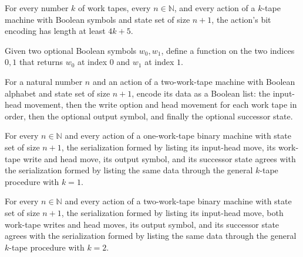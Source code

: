 \begin{lemma}
\label{Turing.codeActionK_length}
\leanok
{}
For every number $k$ of work tapes, every $n\in\mathbb N$, and every action of a
$k$-tape machine with Boolean symbols and state set of size $n+1$, the action’s bit
encoding has length at least $4k+5$.
\end{lemma}

\begin{definition}
\label{Turing.workPair}
\leanok
Given two optional Boolean symbols $w_0,w_1$, define a function on the two indices $0,1$
that returns $w_0$ at index $0$ and $w_1$ at index $1$.
\end{definition}

\begin{definition}
\leanok
{}
For a natural number $n$ and an action of a two-work-tape machine with Boolean alphabet
and state set of size $n+1$, encode its data as a Boolean list: the input-head movement,
then the write option and head movement for each work tape in order, then the optional
output symbol, and finally the optional successor state.
\end{definition}

\begin{lemma}
\label{Turing.actionBits_eq_actionBitsK}
\leanok
{}
For every $n\in\mathbb{N}$ and every action of a one-work-tape binary machine with state
set of size $n+1$, the serialization formed by listing its input-head move, its
work-tape write and head move, its output symbol, and its successor state agrees with
the serialization formed by listing the same data through the general $k$-tape procedure
with $k=1$.
\end{lemma}

\begin{lemma}
\leanok
{}
For every $n\in\mathbb{N}$ and every action of a two-work-tape binary machine with state
set of size $n+1$, the serialization formed by listing its input-head move, both
work-tape writes and head moves, its output symbol, and its successor state agrees with
the serialization formed by listing the same data through the general $k$-tape procedure
with $k=2$.
\end{lemma}

